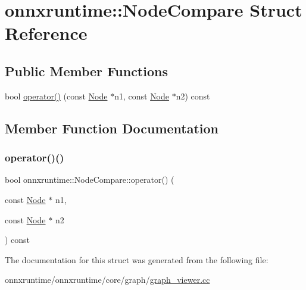 \hypertarget{structonnxruntime_1_1NodeCompare}{}\section{onnxruntime\+:\+:Node\+Compare Struct Reference}
\label{structonnxruntime_1_1NodeCompare}
\subsection*{Public Member Functions}
\begin{DoxyCompactItemize}
\item 
bool \mbox{\hyperlink{structonnxruntime_1_1NodeCompare_aed54305eff830fe5357e49ec1d6a7700}{operator()}} (const \mbox{\hyperlink{classonnxruntime_1_1Node}{Node}} $\ast$n1, const \mbox{\hyperlink{classonnxruntime_1_1Node}{Node}} $\ast$n2) const
\end{DoxyCompactItemize}


\subsection{Member Function Documentation}
\mbox{\label{structonnxruntime_1_1NodeCompare_aed54305eff830fe5357e49ec1d6a7700}} 
\subsubsection{\texorpdfstring{operator()()}{operator()()}}
{\footnotesize\ttfamily bool onnxruntime\+::\+Node\+Compare\+::operator() (\begin{DoxyParamCaption}\item[{const \mbox{\hyperlink{classonnxruntime_1_1Node}{Node}} $\ast$}]{n1,  }\item[{const \mbox{\hyperlink{classonnxruntime_1_1Node}{Node}} $\ast$}]{n2 }\end{DoxyParamCaption}) const\hspace{0.3cm}{\ttfamily [inline]}}



The documentation for this struct was generated from the following file\+:\begin{DoxyCompactItemize}
\item 
onnxruntime/onnxruntime/core/graph/\mbox{\hyperlink{graph__viewer_8cc}{graph\+\_\+viewer.\+cc}}\end{DoxyCompactItemize}
